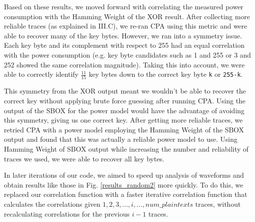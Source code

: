 \documentclass[journal]{ieee_style}
\begin{document}
Based on these results, we moved forward with correlating the measured power consumption with the Hamming Weight of the XOR result. After collecting more reliable traces (as explained in III.C), we re-ran CPA using this metric and were able to recover many of the key bytes. However, we ran into a symmetry issue. Each key byte and its complement with respect to 255 had an equal correlation with the power consumption (e.g. key byte candidates such as 1 and 255 or 3 and 252 showed the same correlation magnitude). Taking this into account, we were able to correctly identify $\frac{11}{15}$ key bytes down to the correct key byte \texttt{k} or \texttt{255-k}. 

This symmetry from the XOR output meant we wouldn't be able to recover the correct key without applying brute force guessing after running CPA. Using the output of the SBOX for the power model would have the advantage of avoiding this symmetry, giving us one correct key. After getting more reliable traces, we retried CPA with a power model employing the Hamming Weight of the SBOX output and found that this was actually a reliable power model to use. Using Hamming Weight of SBOX output while increasing the number and reliability of traces we used, we were able to recover all key bytes.

 In later iterations of our code, we aimed to speed up analysis of waveforms and obtain results like those in Fig. \ref{results_random2} more quickly. To do this, we replaced our correlation function with a faster iterative correlation function that calculates the correlations given $1,2,3,\ldots, i, \ldots, num\_plaintexts$ traces, without recalculating correlations for the previous $i-1$ traces.
\end{document}
